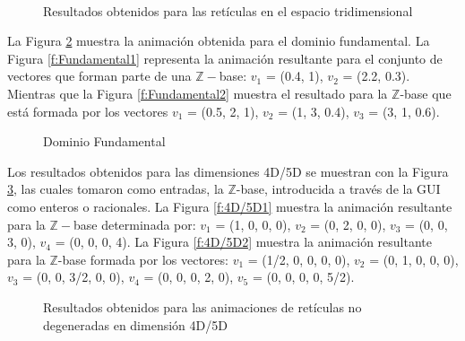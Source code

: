 \documentclass{llncs}
\begin{document}
\begin{figure}
	\centering
	\\
	\caption{Resultados obtenidos para las ret\'iculas en el espacio tridimensional}
	\label{Tridimensional}
\end{figure}

La Figura \ref{Fundamental} muestra la animación obtenida para el dominio fundamental. La Figura \ref{f:Fundamental1} representa la animación resultante para el conjunto de vectores que forman parte de una $\mathbb{Z}-$base: $v_{1}$ = (0.4, 1), $v_{2}$ = (2.2, 0.3). Mientras que la Figura \ref{f:Fundamental2} muestra el resultado para la $\mathbb{Z}$-base que está formada por los vectores $v_{1}$ = (0.5, 2, 1), $v_{2}$ = (1, 3, 0.4), $v_{3}$ = (3, 1, 0.6). 

\begin{figure}
	\centering
	\caption{Dominio Fundamental}
	\label{Fundamental}
\end{figure}

Los resultados obtenidos para las dimensiones 4D/5D se muestran con la Figura \ref{Dimensiones 4D/5D}, las cuales tomaron como entradas, la $\mathbb{Z}$-base, introducida a través de la GUI como enteros o racionales. La Figura \ref{f:4D/5D1} muestra la animación resultante para la $\mathbb{Z}-$base determinada por: $v_1$ = (1, 0, 0, 0), $v_2$ = (0, 2, 0, 0), $v_3$ = (0, 0, 3, 0), $v_4$ = (0, 0, 0, 4). La Figura \ref{f:4D/5D2} muestra la animación resultante para la  $\mathbb{Z}$-base formada por los vectores: $v_1$ = (1/2, 0, 0, 0, 0), $v_2$ = (0, 1, 0, 0, 0), $v_3$ = (0, 0, 3/2, 0, 0), $v_4$ = (0, 0, 0, 2, 0), $v_5$ = (0, 0, 0, 0, 5/2).

\begin{figure}
	\centering
	\caption{Resultados obtenidos para las animaciones de retículas no degeneradas en dimensión 4D/5D}
	\label{Dimensiones 4D/5D}
\end{figure}
\end{document}
